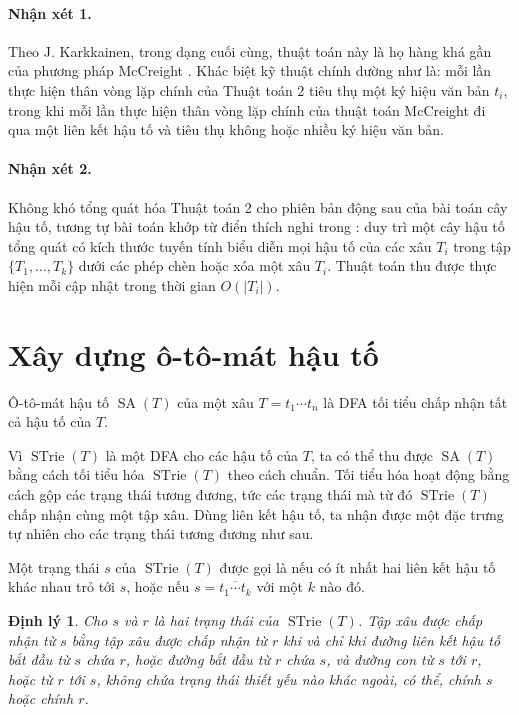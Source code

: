 \documentclass[11pt]{article}
\newtheorem{theorem}{Định lý}
\newcommand{\STrie}{\operatorname{STrie}}
\newcommand{\SA}{\operatorname{SA}}
\begin{document}
\paragraph{Nhận xét 1.}
Theo J. Karkkainen, trong dạng cuối cùng, thuật toán này là họ hàng khá gần
của phương pháp McCreight \cite{mccreight}. Khác biệt kỹ thuật chính dường
như là: mỗi lần thực hiện thân vòng lặp chính của Thuật toán 2 tiêu thụ một
ký hiệu văn bản $t_i$, trong khi mỗi lần thực hiện thân vòng lặp chính của
thuật toán McCreight đi qua một liên kết hậu tố và tiêu thụ không hoặc nhiều
ký hiệu văn bản.

\paragraph{Nhận xét 2.}
Không khó tổng quát hóa Thuật toán 2 cho phiên bản động sau của bài toán cây
hậu tố, tương tự bài toán khớp từ điển thích nghi trong \cite{amir-farach}:
duy trì một cây hậu tố tổng quát có kích thước tuyến tính biểu diễn mọi hậu tố
của các xâu $T_i$ trong tập $\{T_1,\ldots,T_k\}$ dưới các phép chèn hoặc xóa
một xâu $T_i$. Thuật toán thu được thực hiện mỗi cập nhật trong thời gian
$O(|T_i|)$.

\section{Xây dựng ô-tô-mát hậu tố}

Ô-tô-mát hậu tố $\SA(T)$ của một xâu $T=t_1\cdots t_n$ là DFA tối tiểu chấp
nhận tất cả hậu tố của $T$.

Vì $\STrie(T)$ là một DFA cho các hậu tố của $T$, ta có thể thu được
$\SA(T)$ bằng cách tối tiểu hóa $\STrie(T)$ theo cách chuẩn. Tối tiểu hóa hoạt
động bằng cách gộp các trạng thái tương đương, tức các trạng thái mà từ đó
$\STrie(T)$ chấp nhận cùng một tập xâu. Dùng liên kết hậu tố, ta nhận được một
đặc trưng tự nhiên cho các trạng thái tương đương như sau.

Một trạng thái $s$ của $\STrie(T)$ được gọi là  nếu có ít nhất
hai liên kết hậu tố khác nhau trỏ tới $s$, hoặc nếu
$s=\overline{t_1\cdots t_k}$ với một $k$ nào đó.

\begin{theorem}
Cho $s$ và $r$ là hai trạng thái của $\STrie(T)$. Tập xâu được chấp nhận từ
$s$ bằng tập xâu được chấp nhận từ $r$ khi và chỉ khi đường liên kết hậu tố
bắt đầu từ $s$ chứa $r$, hoặc đường bắt đầu từ $r$ chứa $s$, và đường con từ
$s$ tới $r$, hoặc từ $r$ tới $s$, không chứa trạng thái thiết yếu nào khác
ngoài, có thể, chính $s$ hoặc chính $r$.
\end{theorem}
\end{document}
